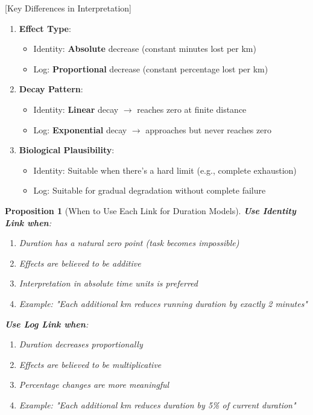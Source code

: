 \documentclass{article}
\newtheorem{proposition}{Proposition}
\begin{document}
[Key Differences in Interpretation]
\begin{enumerate}
    \item \textbf{Effect Type}:
    \begin{itemize}
        \item Identity: \textbf{Absolute} decrease (constant minutes lost per km)
        \item Log: \textbf{Proportional} decrease (constant percentage lost per km)
    \end{itemize}
    
    \item \textbf{Decay Pattern}:
    \begin{itemize}
        \item Identity: \textbf{Linear} decay $\rightarrow$ reaches zero at finite distance
        \item Log: \textbf{Exponential} decay $\rightarrow$ approaches but never reaches zero
    \end{itemize}
    
    \item \textbf{Biological Plausibility}:
    \begin{itemize}
        \item Identity: Suitable when there's a hard limit (e.g., complete exhaustion)
        \item Log: Suitable for gradual degradation without complete failure
    \end{itemize}
\end{enumerate}


\begin{proposition}[When to Use Each Link for Duration Models]
\textbf{Use Identity Link when}:
\begin{enumerate}
    \item Duration has a natural zero point (task becomes impossible)
    \item Effects are believed to be additive
    \item Interpretation in absolute time units is preferred
    \item Example: "Each additional km reduces running duration by exactly 2 minutes"
\end{enumerate}

\textbf{Use Log Link when}:
\begin{enumerate}
    \item Duration decreases proportionally
    \item Effects are believed to be multiplicative
    \item Percentage changes are more meaningful
    \item Example: "Each additional km reduces duration by 5\% of current duration"
\end{enumerate}
\end{proposition}
\end{document}

